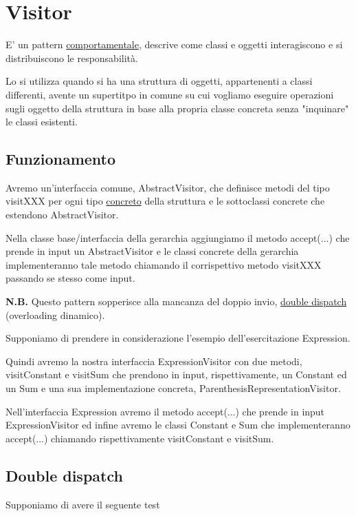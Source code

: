\chapter{Visitor}

E' un pattern \underline{comportamentale}, descrive come classi e oggetti interagiscono e si distribuiscono le responsabilità. 
\smallskip

Lo si utilizza quando si ha una struttura di oggetti, appartenenti a classi differenti, avente un supertitpo in comune su cui vogliamo eseguire operazioni sugli 
oggetto della struttura in base alla propria classe concreta senza "inquinare" le classi esistenti.

\section{Funzionamento}

Avremo un'interfaccia comune, AbstractVisitor, che definisce metodi del tipo visitXXX per ogni tipo \underline{concreto} della struttura e le sottoclassi concrete 
che estendono AbstractVisitor.

Nella classe base/interfaccia della gerarchia aggiungiamo il metodo accept(...) che prende in input un AbstractVisitor e le classi concrete della gerarchia 
implementeranno tale metodo chiamando il corrispettivo metodo visitXXX passando se stesso come input.
\medskip

\textbf{N.B.} Questo pattern sopperisce alla mancanza del doppio invio, \underline{double dispatch}  (overloading dinamico).
\medskip

Supponiamo di prendere in considerazione l'esempio dell'esercitazione Expression.

Quindi avremo la nostra interfaccia ExpressionVisitor con due metodi, visitConstant e visitSum che prendono in input, rispettivamente, un Constant ed un Sum e una 
sua implementazione concreta, ParenthesisRepresentationVisitor. 

Nell'interfaccia Expression avremo il metodo accept(...) che prende in input ExpressionVisitor ed infine avremo le classi Constant e Sum che implementeranno 
accept(...) chiamando rispettivamente visitConstant e visitSum.

\section{Double dispatch}

Supponiamo di avere il seguente test

